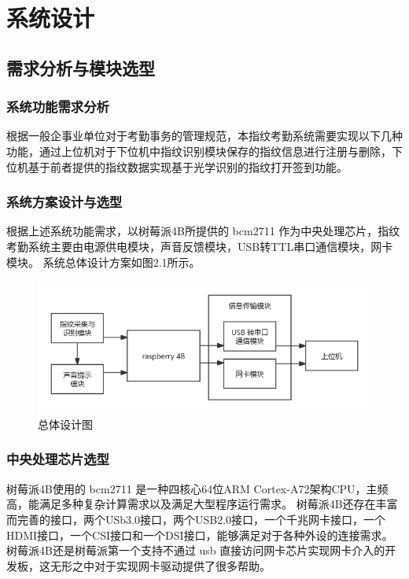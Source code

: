 \section{系统设计}

\subsection{需求分析与模块选型}

\subsubsection{系统功能需求分析}

根据一般企事业单位对于考勤事务的管理规范，本指纹考勤系统需要实现以下几种功能，通过上位机对于下位机中指纹识别模块保存的指纹信息进行注册与删除，下位机基于前者提供的指纹数据实现基于光学识别的指纹打开签到功能。

\subsubsection{系统方案设计与选型}

根据上述系统功能需求，以树莓派4B所提供的 bcm2711 作为中央处理芯片，指纹考勤系统主要由电源供电模块，声音反馈模块，USB转TTL串口通信模块，网卡模块。
系统总体设计方案如图2.1所示。

\begin{figure}[ht]
    \centering
    \includegraphics[width=\textwidth]{imgs/总体设计图.png}
    \caption{总体设计图}    \label{overall_design}
\end{figure}

\subsubsection{中央处理芯片选型}

树莓派4B使用的 bcm2711 是一种四核心64位ARM Cortex-A72架构CPU，主频高，能满足多种复杂计算需求以及满足大型程序运行需求。
树莓派4B还存在丰富而完善的接口，两个USb3.0接口，两个USB2.0接口，一个千兆网卡接口，一个HDMI接口，一个CSI接口和一个DSI接口，能够满足对于各种外设的连接需求。
树莓派4B还是树莓派第一个支持不通过 usb 直接访问网卡芯片实现网卡介入的开发板，这无形之中对于实现网卡驱动提供了很多帮助。

